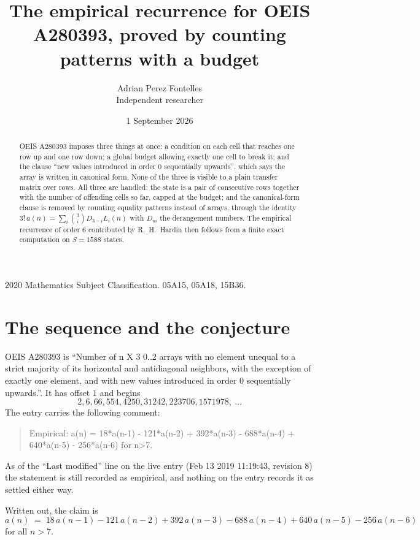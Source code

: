 \documentclass[11pt,a4paper]{article}
\title{The empirical recurrence for OEIS A280393, proved by counting patterns with a budget}
\author{Adrian Perez Fontelles\\ \small Independent researcher}
\date{1 September 2026}
\theoremstyle{plain}
\theoremstyle{definition}
\begin{document}
\maketitle

\begin{abstract}
OEIS A280393 imposes three things at once: a condition on each cell that reaches one row up and
one row down; a global budget allowing exactly one cell to
break it; and the clause ``new values introduced in order $0$ sequentially upwards'', which
says the array is written in canonical form. None of the three is visible to a plain transfer
matrix over rows. All three are handled: the state is a pair of consecutive rows
together with the number of offending cells so far, capped at the budget; and the
canonical-form clause is removed by counting equality patterns instead of arrays, through the
identity $3!\,a(n)=\sum_i\binom{3}{i}D_{3-i}L_i(n)$ with $D_m$ the derangement
numbers. The empirical recurrence of order $6$ contributed by R.~H.~Hardin then follows
from a finite exact computation on $S=1588$ states.
\end{abstract}

\noindent\small 2020 Mathematics Subject Classification. 05A15, 05A18, 15B36.\normalsize

\section{The sequence and the conjecture}

OEIS A280393 is ``Number of n X 3 0..2 arrays with no element unequal to a strict majority of its horizontal and antidiagonal neighbors, with the exception of exactly one element, and with new values introduced in order 0 sequentially upwards.''. It has offset $1$ and begins
\[
2, 6, 66, 554, 4250, 31242, 223706, 1571978,\ \dots
\]
The entry carries the following comment:
\begin{quote}\small
Empirical: a(n) = 18*a(n-1) - 121*a(n-2) + 392*a(n-3) - 688*a(n-4) + 640*a(n-5) - 256*a(n-6) for n>7.
\end{quote}
As of the ``Last modified'' line on the live entry (Feb 13 2019 11:19:43, revision 8) the statement is
still recorded as empirical, and nothing on the entry records it as settled either way.

Written out, the claim is
\begin{equation}\label{eq:conj}
a(n)\;=\;18\,a(n-1) - 121\,a(n-2) + 392\,a(n-3) - 688\,a(n-4) + 640\,a(n-5) - 256\,a(n-6)
\end{equation}
for all $n>7$.
\end{document}
